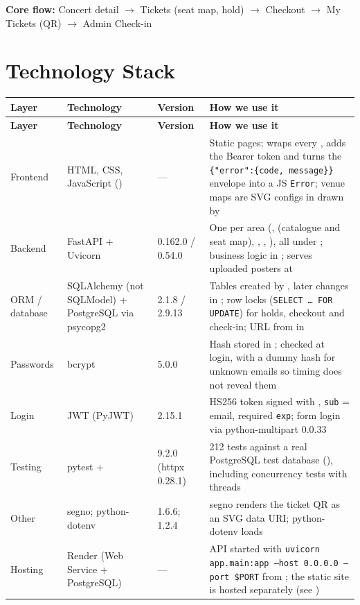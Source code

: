 \documentclass[11pt,a4paper]{article}
\newcommand{\code}[1]{\begingroup\let\codeus\_\renewcommand{\_}{\codeus\allowbreak}\texttt{#1}\endgroup}
\begin{document}
\textbf{Core flow:} Concert detail $\to$ Tickets (seat map, hold) $\to$ Checkout $\to$ My Tickets (QR) $\to$ Admin Check-in


\section{Technology Stack}

{\small
\begin{xltabular}{\linewidth}{@{}R{1.9cm} R{3.3cm} R{2.1cm} Y@{}}
\toprule
\bfseries Layer & \bfseries Technology & \bfseries Version & \bfseries How we use it \\
\midrule
\endfirsthead
\toprule
\bfseries Layer & \bfseries Technology & \bfseries Version & \bfseries How we use it \\
\midrule
\endhead
\bottomrule
\endfoot
Frontend         & HTML, CSS, JavaScript ()     & ---          & Static pages;  wraps every , adds the Bearer token and turns the \code{\{"error":\{code, message\}\}} envelope into a JS \code{Error}; venue maps are SVG configs in  drawn by  \\
Backend          & FastAPI + Uvicorn                        & 0.162.0 / 0.54.0 & One  per area (,  (catalogue and seat map), , , ), all under ; business logic in ;  serves uploaded posters at  \\
ORM / database   & SQLAlchemy (not SQLModel) + PostgreSQL via psycopg2  & 2.1.8 / 2.9.13 & Tables created by , later changes in ; row locks (\code{SELECT \ldots{} FOR UPDATE}) for holds, checkout and check-in; URL from  in  \\
Passwords        & bcrypt                                   & 5.0.0        & Hash stored in ; checked at login, with a dummy hash for unknown emails so timing does not reveal them \\
Login            & JWT (PyJWT)                              & 2.15.1       & HS256 token signed with , \code{sub} = email, required \code{exp}; form login via python-multipart 0.0.33 \\
Testing          & pytest +                & 9.2.0 (httpx 0.28.1) & 212 tests against a real PostgreSQL test database (), including concurrency tests with threads \\
Other            & segno; python-dotenv                     & 1.6.6; 1.2.4 & segno renders the ticket QR as an SVG data URI; python-dotenv loads  \\
Hosting          & Render (Web Service + PostgreSQL)        & ---          & API started with \code{uvicorn app.\allowbreak{}main:app --host 0.0.0.0 --port \$PORT} from ; the static site is hosted separately (see ) \\
\end{xltabular}}
\end{document}
